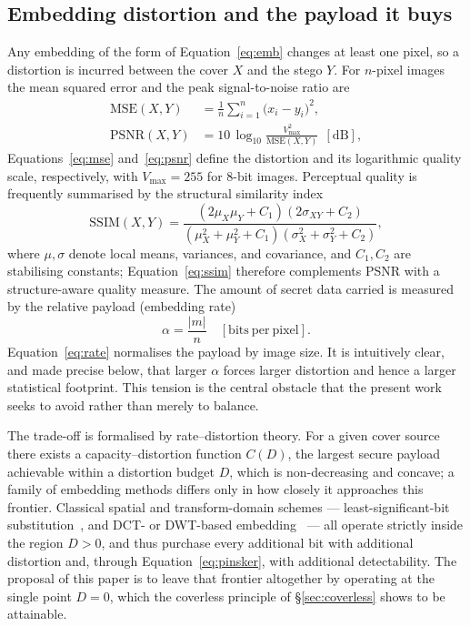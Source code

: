 \documentclass[11pt]{article}
\theoremstyle{definition}
\newcommand{\Eqn}[1]{Equation~\eqref{#1}}
\begin{document}
\subsection{Embedding distortion and the payload it buys}\label{sec:distortion}
Any embedding of the form of \Eqn{eq:emb} changes at least one pixel, so a
distortion is incurred between the cover $X$ and the stego $Y$. For $n$-pixel
images the mean squared error and the peak signal-to-noise ratio are
\begin{align}
  \mathrm{MSE}(X,Y) &= \frac{1}{n}\sum_{i=1}^{n}\bigl(x_i-y_i\bigr)^2,
  \label{eq:mse}\\
  \mathrm{PSNR}(X,Y) &= 10\,\log_{10}\!\frac{V_{\max}^2}{\mathrm{MSE}(X,Y)}\ \ [\mathrm{dB}],
  \label{eq:psnr}
\end{align}
Equations~\eqref{eq:mse} and~\eqref{eq:psnr} define the distortion and its
logarithmic quality scale, respectively, with $V_{\max}=255$ for 8-bit images.
Perceptual quality is frequently summarised
by the structural similarity index
\begin{equation}
  \mathrm{SSIM}(X,Y)=\frac{(2\mu_X\mu_Y+C_1)(2\sigma_{XY}+C_2)}
       {(\mu_X^2+\mu_Y^2+C_1)(\sigma_X^2+\sigma_Y^2+C_2)},
  \label{eq:ssim}
\end{equation}
where $\mu,\sigma$ denote local means, variances, and covariance, and $C_1,C_2$ are
stabilising constants; Equation~\eqref{eq:ssim} therefore complements PSNR with a
structure-aware quality measure. The amount of secret data carried is measured by the
relative payload (embedding rate)
\begin{equation}
  \alpha=\frac{|m|}{n}\quad[\mathrm{bits\ per\ pixel}].
  \label{eq:rate}
\end{equation}
Equation~\eqref{eq:rate} normalises the payload by image size. It is intuitively
clear, and made precise below, that larger $\alpha$ forces larger
distortion and hence a larger statistical footprint. This tension is the central
obstacle that the present work seeks to avoid rather than merely to balance.

The trade-off is formalised by rate--distortion theory. For a given cover source
there exists a capacity--distortion function $C(D)$, the largest secure payload
achievable within a distortion budget $D$, which is non-decreasing and concave; a
family of embedding methods differs only in how closely it approaches this frontier.
Classical spatial and transform-domain schemes --- least-significant-bit
substitution~\cite{chan2004}, and DCT- or DWT-based embedding~\cite{westfeld2001f5} --- all operate strictly inside the
region $D>0$, and thus purchase every additional bit with additional distortion and,
through \Eqn{eq:pinsker}, with additional detectability. The proposal of this paper
is to leave that frontier altogether by operating at the single point $D=0$, which
the coverless principle of \S\ref{sec:coverless} shows to be attainable.
\end{document}
